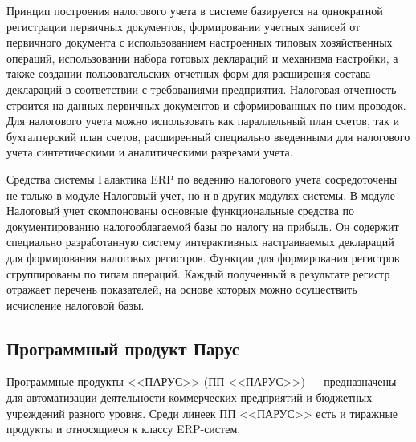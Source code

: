\documentclass[14pt,a4paper]{reportmod}
\begin{document}
Принцип построения налогового учета в системе базируется на однократной регистрации первичных документов, формировании учетных записей от первичного документа с использованием настроенных типовых хозяйственных операций, использовании набора готовых деклараций и механизма настройки, а также создании пользовательских отчетных форм для расширения состава деклараций в соответствии с требованиями предприятия. Налоговая отчетность строится на данных первичных документов и сформированных по ним проводок. Для налогового учета можно использовать как параллельный план счетов, так и бухгалтерский план счетов, расширенный специально введенными для налогового учета синтетическими и аналитическими разрезами учета.


Средства системы Галактика ERP по ведению налогового учета сосредоточены не только в модуле Налоговый учет, но и в других модулях системы. В модуле Налоговый учет скомпонованы основные функциональные средства по документированию налогооблагаемой базы по налогу на прибыль. Он содержит специально разработанную систему интерактивных настраиваемых деклараций для формирования налоговых регистров. Функции для формирования регистров сгруппированы по типам операций. Каждый полученный в результате регистр отражает перечень показателей, на основе которых можно осуществить исчисление налоговой базы.


\subsection{Программный продукт Парус}
Программные продукты <<ПАРУС>> (ПП <<ПАРУС>>) — предназначены для автоматизации деятельности коммерческих предприятий и бюджетных учреждений разного уровня. Среди линеек ПП <<ПАРУС>> есть и тиражные продукты и относящиеся к классу ERP-систем.
\end{document}
